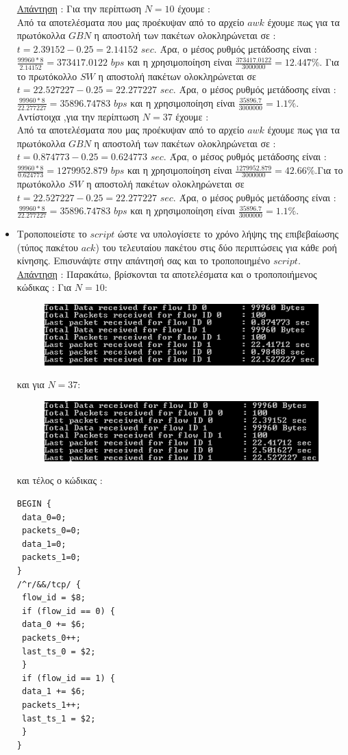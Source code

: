 \documentclass{article}%
\begin{document}
\begin{itemize}
\underline{Απάντηση} : Για την περίπτωση $N=10$ έχουμε :\\
Από τα αποτελέσματα που μας προέκυψαν από το αρχείο $awk$ έχουμε πως για τα πρωτόκολλα $GBN$ η αποστολή των πακέτων ολοκληρώνεται σε : $t=2.39152-0.25=2.14152$ $sec$. Άρα, ο μέσος ρυθμός μετάδοσης είναι : $\frac{99960*8}{2.14152}=373417.0122$ $bps$ και η χρησιμοποίηση είναι $\frac{373417.0122}{3000000}=12.447\%$. Για το πρωτόκολλο $SW$ η αποστολή πακέτων ολοκληρώνεται σε $t=22.527227-0.25=22.277227$ $sec$. Άρα, ο μέσος ρυθμός μετάδοσης είναι : $\frac{99960*8}{22.277227}=35896.74783$ $bps$ και η χρησιμοποίηση είναι $\frac{35896.7}{3000000}=1.1\%$.\\
Αντίστοιχα ,για την περίπτωση $N=37$ έχουμε : \\ 
Από τα αποτελέσματα που μας προέκυψαν από το αρχείο $awk$ έχουμε πως για τα πρωτόκολλα $GBN$ η αποστολή των πακέτων ολοκληρώνεται σε : $t=0.874773-0.25=0.624773$ $sec$. Άρα, ο μέσος ρυθμός μετάδοσης είναι : $\frac{99960*8}{0.624773}=1279952.879$ $bps$ και η χρησιμοποίηση είναι $\frac{1279952.879}{3000000}=42.66\%$.Για το πρωτόκολλο $SW$ η αποστολή πακέτων ολοκληρώνεται σε $t=22.527227-0.25=22.277227$ $sec$. Άρα, ο μέσος ρυθμός μετάδοσης είναι : $\frac{99960*8}{22.277227}=35896.74783$ $bps$ και η χρησιμοποίηση είναι $\frac{35896.7}{3000000}=1.1\%$.\\
\item Τροποποιείστε το $script$ ώστε να υπολογίσετε το χρόνο λήψης της επιβεβαίωσης (τύπος πακέτου
$ack$) του τελευταίου πακέτου στις δύο περιπτώσεις για κάθε ροή κίνησης. Επισυνάψτε στην
απάντησή σας και το τροποποιημένο $script$.\\
\underline{Απάντηση} : Παρακάτω, βρίσκονται τα αποτελέσματα και ο τροποποιήμενος κώδικας :
Για $N=10$:
\begin{figure}[htbp]
	\centering
		\includegraphics[width=1.00\textwidth]{6.png}
	\label{fig:6}
\end{figure}


και για $N=37$:
\begin{figure}[htbp]
	\centering
		\includegraphics[width=1.00\textwidth]{7.png}
	\label{fig:7}
\end{figure}
και τέλος ο κώδικας :
\begin{verbatim}
BEGIN {
 data_0=0;
 packets_0=0;
 data_1=0;
 packets_1=0;
}
/^r/&&/tcp/ {
 flow_id = $8;
 if (flow_id == 0) {
 data_0 += $6;
 packets_0++;
 last_ts_0 = $2;
 }
 if (flow_id == 1) {
 data_1 += $6;
 packets_1++;
 last_ts_1 = $2;
 }
}


\end{verbatim}
\end{itemize}
\end{document}

